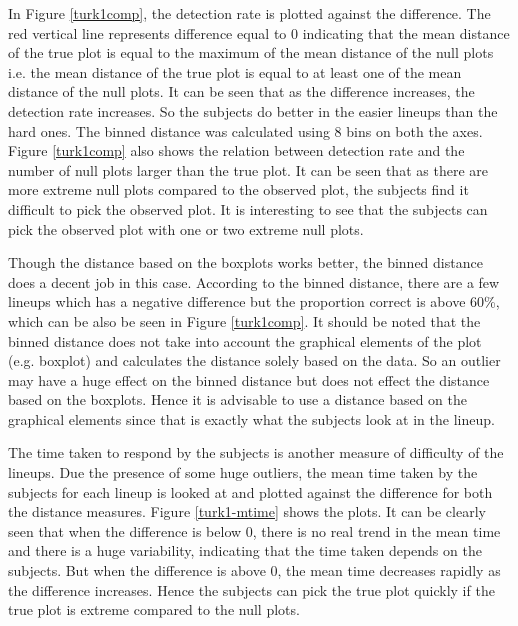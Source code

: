 \documentclass[12]{article}
\begin{document}

In Figure \ref{turk1comp}, the detection rate is plotted against the difference. The red vertical line represents difference equal to 0 indicating that the mean distance of the true plot is equal to the maximum of the mean distance of the null plots i.e. the mean distance of the true plot is equal to at least one of the mean distance of the null plots. It can be seen that as the difference increases, the detection rate increases. So the subjects do better in the easier lineups than the hard ones. The binned distance was calculated using 8 bins on both the axes. Figure \ref{turk1comp} also shows the relation between detection rate and the number of null plots larger than the true plot. It can be seen that as there are more extreme null plots compared to the observed plot, the subjects find it difficult to pick the observed plot. It is interesting to see that the subjects can pick the observed plot with one or two extreme null plots. 

Though the distance based on the boxplots works better, the binned distance does a decent job in this case. According to the binned distance, there are a few lineups which has a negative difference but the proportion correct is above 60\%, which can be also be seen in Figure \ref{turk1comp}. It should be noted that the binned distance does not take into account the graphical elements of the plot (e.g. boxplot) and calculates the distance solely based on the data. So an outlier may have a huge effect on the binned distance but does not effect the distance based on the boxplots. Hence it is advisable to use a distance based on the graphical elements since that is exactly what the subjects look at in the lineup.

The time taken to respond by the subjects is another measure of difficulty of the lineups. Due the presence of some huge outliers, the mean time taken by the subjects for each lineup is looked at and plotted against the difference for both the distance measures. Figure \ref{turk1-mtime} shows the plots. It can be clearly seen that when the difference is below 0, there is no real trend in the mean time and there is a huge variability, indicating that the time taken depends on the subjects. But when the difference is above 0, the mean time decreases rapidly as the difference increases. Hence the subjects can pick the true plot quickly if the true plot is extreme compared to the null plots.
 
\end{document}
